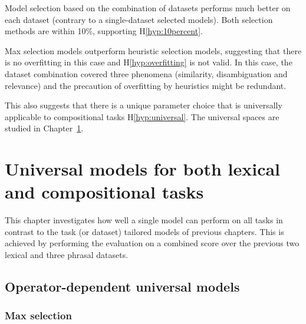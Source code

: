 Model selection based on the combination of datasets performs much better on each dataset (contrary to a single-dataset selected models). Both selection methods are within 10\%, supporting H\ref{hyp:10percent}.

Max selection models outperform heuristic selection models, suggesting that there is no overfitting in this case and H\ref{hyp:overfitting} is not valid. In this case, the dataset combination covered three phenomena (similarity, disambiguation and relevance) and the precaution of overfitting by heuristics might be redundant.

This also suggests that there is a unique parameter choice that is universally applicable to compositional tasks H\ref{hyp:universal}. The universal spaces are studied in Chapter~\ref{sec:universal-param-selection}.

\chapter[Universal models]{Universal models for both lexical and compositional tasks}
\label{sec:universal-param-selection}

This chapter investigates how well a single model can perform on all tasks in contrast to the task (or dataset) tailored models of previous chapters. This is achieved by performing the evaluation on a combined score over the previous two lexical and three phrasal datasets.

\section{Operator-dependent universal models}
\label{sec:model-selection}

\subsection{Max selection}
\label{sec:max-selection-universal}


